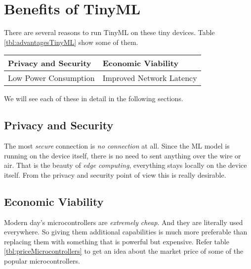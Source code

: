 \documentclass[../../main]{subfiles}
\begin{document}
\section{Benefits of TinyML} \label{sec:}

There are several reasons to run TinyML on these tiny devices. Table
\ref{tbl:advantagesTinyML} show some of them.

\begin{center}
    \begin{tabularx} {\textwidth} {
            >{\centering \arraybackslash}X
            >{\centering \arraybackslash}X
        }
        \toprule
        \midrule

        Privacy and Security & Economic Viability \\
        \midrule
        Low Power Consumption & Improved Network Latency \\

        \midrule
        \bottomrule

    \end{tabularx}

    \label{tbl:advantagesTinyML}

\end{center}

We will see each of these in detail in the following sections.

\subsection{Privacy and Security}

The most \emph{secure} connection is \emph{no connection} at all. Since the
ML model is running on the device itself, there is no need to sent anything
over the wire or air. That is the beauty of \emph{edge computing}, everything
stays locally on the device itself. From the privacy and security point of
view this is really desirable.

\subsection{Economic Viability}

Modern day's microcontrollers are \emph{extremely cheap}. And they are
literally used everywhere. So giving them additional capabilities is
much more preferable than replacing them with something that is powerful
but expensive. Refer table \ref{tbl:priceMicrocontrollers} to get
an idea about the market price of some of the popular microcontrollers.
\end{document}

